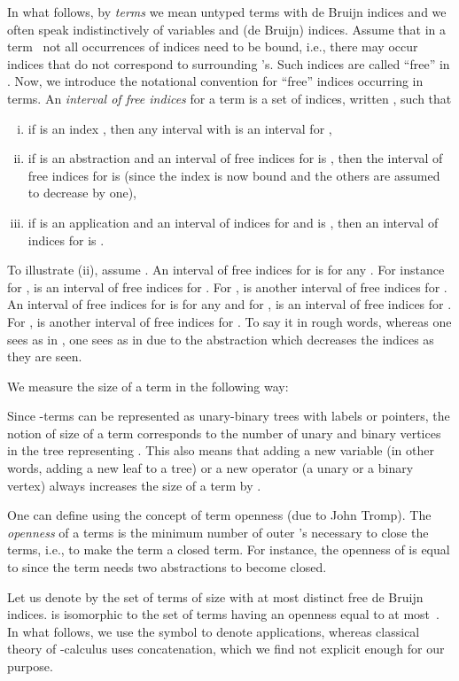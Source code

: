 \documentclass{jfp1}
\begin{document}
In what follows, by \emph{terms} we mean untyped terms with de Bruijn indices and we
often speak indistinctively of variables and (de Bruijn) indices.  Assume that in a
term~ not all occurrences of indices need to be bound, i.e., there may occur indices that do
not correspond to surrounding 's. Such indices are called ``free'' in .  Now,
we introduce the notational convention for ``free'' indices occurring in terms. An
\emph{interval of free indices} for a term  is a set  of indices, written , such that
\begin{enumerate}[(i)]
\item if  is an index , then any interval  with  is an interval for ,
\item if  is an abstraction  and an interval of free indices for  is
  , then the interval of free indices for  is
   (since the index  is now bound and the others are
  assumed to decrease by one),
\item if  is an application  and an interval of indices for  and
   is , then an interval of indices for  is
  .
\end{enumerate}
To illustrate (ii), assume . An interval of free
indices for  is  for any .  For
instance for ,  is an interval of free
indices for .  For ,  is another interval of
free indices for . An interval of free indices for  is  
for any  and for ,  is an
interval of free indices for .  For ,  is another interval
of free indices for .  To say it in rough words, whereas one sees  as
 in , one sees  as  in  due to the abstraction 
which decreases the indices as they are seen.

We measure the size of a term in the following way:


Since -terms can be represented as unary-binary trees with labels or pointers,
the notion of size of a term  corresponds to the number of unary and binary
vertices in the tree representing . This also means that adding a new variable (in
other words, adding a new leaf to a tree) or a new operator (a unary or a binary
vertex) always increases the size of a term by .

One can define  using the concept of term openness (due to John Tromp).  The \emph{openness} of a
terms is the minimum number of outer 's necessary to close the terms, i.e., to
make the term a closed term.  For instance, the openness of  is equal to  since the term needs two abstractions to become closed.

Let us denote by  the set of terms of size  with at most  distinct
free de Bruijn indices.   is isomorphic to the set of terms having an
openness equal to at most~.  In what follows, we use the symbol  to denote
applications, whereas classical theory of -calculus uses concatenation, which we
find not explicit enough for our purpose.
\end{document}
